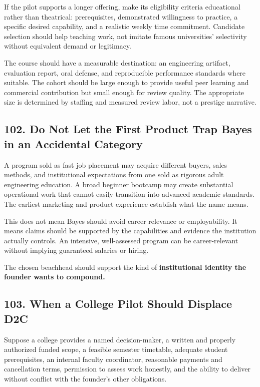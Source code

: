 If the pilot supports a longer offering, make its eligibility criteria educational rather than theatrical: prerequisites, demonstrated willingness to practice, a specific desired capability, and a realistic weekly time commitment. Candidate selection should help teaching work, not imitate famous universities' selectivity without equivalent demand or legitimacy.

The course should have a measurable destination: an engineering artifact, evaluation report, oral defense, and reproducible performance standards where suitable. The cohort should be large enough to provide useful peer learning and commercial contribution but small enough for review quality. The appropriate size is determined by staffing and measured review labor, not a prestige narrative.

\subsection*{102. Do Not Let the First Product Trap Bayes in an Accidental Category}

A program sold as fast job placement may acquire different buyers, sales methods, and institutional expectations from one sold as rigorous adult engineering education. A broad beginner bootcamp may create substantial operational work that cannot easily transition into advanced academic standards. The earliest marketing and product experience establish what the name means.

This does not mean Bayes should avoid career relevance or employability. It means claims should be supported by the capabilities and evidence the institution actually controls. An intensive, well-assessed program can be career-relevant without implying guaranteed salaries or hiring.

The chosen beachhead should support the kind of \textbf{institutional identity the founder wants to compound.}

\subsection*{103. When a College Pilot Should Displace D2C}

Suppose a college provides a named decision-maker, a written and properly authorized funded scope, a feasible semester timetable, adequate student prerequisites, an internal faculty coordinator, reasonable payments and cancellation terms, permission to assess work honestly, and the ability to deliver without conflict with the founder's other obligations.

